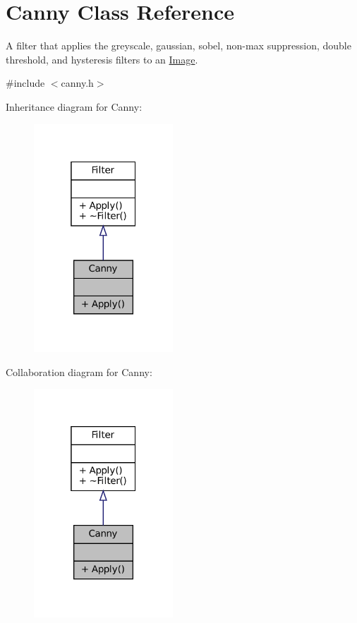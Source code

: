 \hypertarget{classCanny}{}\section{Canny Class Reference}
\label{classCanny}


A filter that applies the greyscale, gaussian, sobel, non-\/max suppression, double threshold, and hysteresis filters to an \hyperlink{classImage}{Image}.  




{\ttfamily \#include $<$canny.\+h$>$}



Inheritance diagram for Canny\+:\nopagebreak
\begin{figure}[H]
\begin{center}
\leavevmode
\includegraphics[width=148pt]{classCanny__inherit__graph}
\end{center}
\end{figure}


Collaboration diagram for Canny\+:\nopagebreak
\begin{figure}[H]
\begin{center}
\leavevmode
\includegraphics[width=148pt]{classCanny__coll__graph}
\end{center}
\end{figure}
